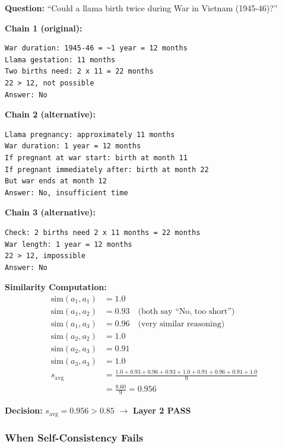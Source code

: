 \documentclass[12pt,a4paper]{article}
\theoremstyle{definition}
\begin{document}
\begin{examplebox}[title=Self-Consistency on StrategyQA]

\textbf{Question:} ``Could a llama birth twice during War in Vietnam (1945-46)?''

\textbf{Chain 1 (original):}
\begin{verbatim}
War duration: 1945-46 = ~1 year = 12 months
Llama gestation: 11 months
Two births need: 2 x 11 = 22 months
22 > 12, not possible
Answer: No
\end{verbatim}

\textbf{Chain 2 (alternative):}
\begin{verbatim}
Llama pregnancy: approximately 11 months
War duration: 1 year = 12 months  
If pregnant at war start: birth at month 11
If pregnant immediately after: birth at month 22
But war ends at month 12
Answer: No, insufficient time
\end{verbatim}

\textbf{Chain 3 (alternative):}
\begin{verbatim}
Check: 2 births need 2 x 11 months = 22 months
War length: 1 year = 12 months
22 > 12, impossible
Answer: No
\end{verbatim}

\textbf{Similarity Computation:}
\begin{align}
\text{sim}(a_1, a_1) &= 1.0 \\
\text{sim}(a_1, a_2) &= 0.93 \quad \text{(both say ``No, too short'')} \\
\text{sim}(a_1, a_3) &= 0.96 \quad \text{(very similar reasoning)} \\
\text{sim}(a_2, a_2) &= 1.0 \\
\text{sim}(a_2, a_3) &= 0.91 \\
\text{sim}(a_3, a_3) &= 1.0 \\
s_{\text{avg}} &= \frac{1.0 + 0.93 + 0.96 + 0.93 + 1.0 + 0.91 + 0.96 + 0.91 + 1.0}{9} \\
&= \frac{8.60}{9} = 0.956
\end{align}

\textbf{Decision:} $s_{\text{avg}} = 0.956 > 0.85$ $\rightarrow$ \textbf{Layer 2 PASS}
\end{examplebox}

\subsubsection{When Self-Consistency Fails}
\end{document}
